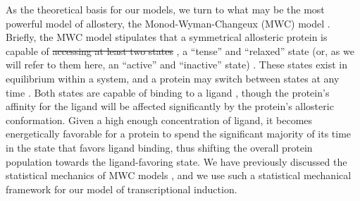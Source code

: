 As the theoretical basis for our models, we turn to what may be the most
powerful  model of allostery, the Monod-Wyman-Changeux (MWC) model
\cite{MONOD1965}.  Briefly,
the MWC model stipulates that a symmetrical allosteric protein is capable of
\sout{accessing at least two states} , a ``tense'' and ``relaxed'' state (or, as we will
refer to them here, an ``active'' and ``inactive'' state) . These states exist in
equilibrium within a system, and a protein may switch between states at any
time . Both states are capable of binding to a ligand , though the protein's
affinity for the ligand will be affected significantly by the protein's
allosteric conformation. Given a high enough concentration of ligand, it becomes
energetically favorable for a protein to spend the significant majority of its
time in the state that favors ligand binding, thus shifting the overall protein
population towards the ligand-favoring state. We have previously discussed the
statistical mechanics of MWC models \cite{Marzen2013}, and we use such a
statistical mechanical framework for our model of transcriptional induction.
 

